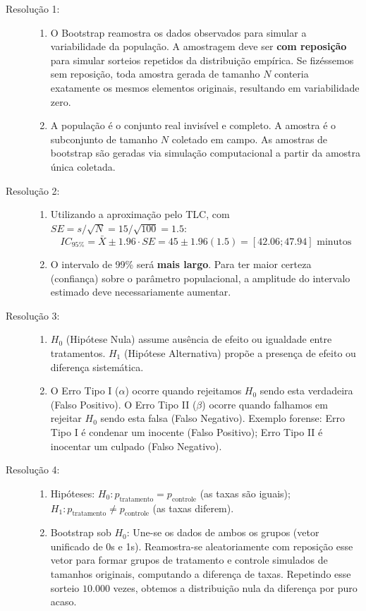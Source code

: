 \documentclass[12pt]{article}
\begin{document}
\begin{description}
    \item[Resolução 1:] 
    \begin{enumerate}[label=\alph*)]
        \item O Bootstrap reamostra os dados observados para simular a variabilidade da população. A amostragem deve ser \textbf{com reposição} para simular sorteios repetidos da distribuição empírica. Se fizéssemos sem reposição, toda amostra gerada de tamanho $N$ conteria exatamente os mesmos elementos originais, resultando em variabilidade zero.
        \item A população é o conjunto real invisível e completo. A amostra é o subconjunto de tamanho $N$ coletado em campo. As amostras de bootstrap são geradas via simulação computacional a partir da amostra única coletada.
    \end{enumerate}

    \item[Resolução 2:] 
    \begin{enumerate}[label=\alph*)]
        \item Utilizando a aproximação pelo TLC, com $SE = s/\sqrt{N} = 15/\sqrt{100} = 1.5$:
        $$IC_{95\%} = \bar{X} \pm 1.96 \cdot SE = 45 \pm 1.96(1.5) = [42.06; 47.94] \text{ minutos}$$
        \item O intervalo de 99\% será \textbf{mais largo}. Para ter maior certeza (confiança) sobre o parâmetro populacional, a amplitude do intervalo estimado deve necessariamente aumentar.
    \end{enumerate}

    \item[Resolução 3:] 
    \begin{enumerate}[label=\alph*)]
        \item $H_0$ (Hipótese Nula) assume ausência de efeito ou igualdade entre tratamentos. $H_1$ (Hipótese Alternativa) propõe a presença de efeito ou diferença sistemática.
        \item O Erro Tipo I ($\alpha$) ocorre quando rejeitamos $H_0$ sendo esta verdadeira (Falso Positivo). O Erro Tipo II ($\beta$) ocorre quando falhamos em rejeitar $H_0$ sendo esta falsa (Falso Negativo). Exemplo forense: Erro Tipo I é condenar um inocente (Falso Positivo); Erro Tipo II é inocentar um culpado (Falso Negativo).
    \end{enumerate}

    \item[Resolução 4:] 
    \begin{enumerate}[label=\alph*)]
        \item Hipóteses: $H_0: p_{\text{tratamento}} = p_{\text{controle}}$ (as taxas são iguais); $H_1: p_{\text{tratamento}} \neq p_{\text{controle}}$ (as taxas diferem).
        \item Bootstrap sob $H_0$: Une-se os dados de ambos os grupos (vetor unificado de 0s e 1s). Reamostra-se aleatoriamente com reposição esse vetor para formar grupos de tratamento e controle simulados de tamanhos originais, computando a diferença de taxas. Repetindo esse sorteio $10.000$ vezes, obtemos a distribuição nula da diferença por puro acaso.
    \end{enumerate}


\end{description}
\end{document}
